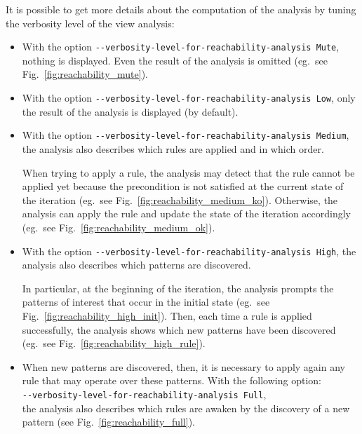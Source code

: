 \documentclass[11pt]{book}
\begin{document}
It is possible to get more details about the computation of the analysis by tuning the verbosity level of the view analysis:
\begin{itemize}
\item With the option \verb?--verbosity-level-for-reachability-analysis Mute?, nothing is displayed. Even the result of the analysis is omitted (eg.~see Fig.~\ref{fig:reachability_mute}).

\item With the option \verb?--verbosity-level-for-reachability-analysis Low?, only the result of the analysis is displayed (by default).

\item With the option \verb?--verbosity-level-for-reachability-analysis Medium?, the analysis also describes which rules are applied and in which order.

When trying to apply a rule, the analysis may detect that the rule cannot be applied yet because the precondition is not satisfied at the current state of the iteration (eg.~see Fig.~\ref{fig:reachability_medium_ko}). Otherwise, the analysis can apply the rule and update the state of the iteration accordingly (eg.~see Fig.~\ref{fig:reachability_medium_ok}).



\item With the option \verb?--verbosity-level-for-reachability-analysis High?, the analysis also describes which patterns are discovered.

In particular, at the beginning of the iteration, the analysis prompts the patterns of interest that occur in the initial state (eg.~see Fig.~\ref{fig:reachability_high_init}). Then, each time a rule is applied successfully, the analysis shows which new patterns have been discovered (eg.~see Fig.~\ref{fig:reachability_high_rule}).


\item When new patterns are discovered, then, it is necessary to apply again any rule that may operate over these patterns. With the following option:\\ {\hfill  \hspace*{2cm}\verb?--verbosity-level-for-reachability-analysis Full?, \hfill\mbox{}}\\
the analysis also describes which rules are awaken by the discovery of a new pattern (see Fig.~\ref{fig:reachability_full}).

\end{itemize}
\end{document}
